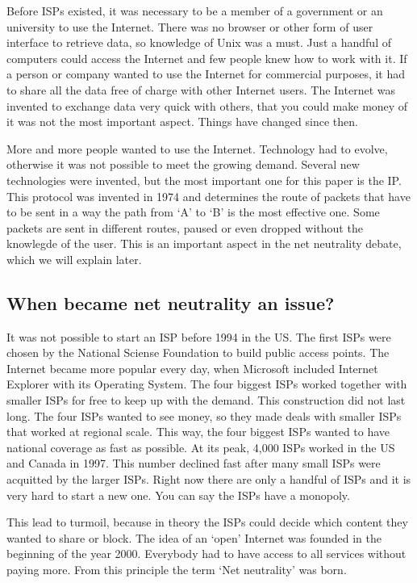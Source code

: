 Before \acp{ISP} existed, it was necessary to be a member of a government or an university to use the Internet. There was no browser or other form of user interface to retrieve data, so knowledge of Unix was a must. Just a handful of computers could access the Internet and few people knew how to work with it. If a person or company wanted to use the Internet for commercial purposes, it had to share all the data free of charge with other Internet users. The Internet was invented to exchange data very quick with others, that you could make money of it was not the most important aspect. Things have changed since then.

More and more people wanted to use the Internet. Technology had to evolve, otherwise it was not possible to meet the growing demand. Several new technologies were invented, but the most important one for this paper is the \acf{IP}. This protocol was invented in 1974 and determines the route of packets that have to be sent in a way the path from `A' to `B' is the most effective one. Some packets are sent in different routes, paused or even dropped without the knowlegde of the user. This is an important aspect in the net neutrality debate, which we will explain later.

\subsection{When became net neutrality an issue?}
It was not possible to start an \ac{ISP} before 1994 in the US. The first \acp{ISP} were chosen by the National Sciense Foundation to build public access points. The Internet became more popular every day,  when Microsoft included Internet Explorer with its Operating System. The four biggest \acp{ISP} worked together with smaller \acp{ISP} for free to keep up with the demand. This construction did not last long. The four \acp{ISP} wanted to see money, so they made deals with smaller \acp{ISP} that worked at regional scale. This way, the four biggest \acp{ISP} wanted to have national coverage as fast as possible. At its peak, 4,000 \acp{ISP} worked in the US and Canada in 1997. This number declined fast after many small \acp{ISP} were acquitted by the larger \acp{ISP}. Right now there are only a handful of \acp{ISP} and it is very hard to start a new one. You can say the \acp{ISP} have a monopoly.

This lead to turmoil, because in theory the \acp{ISP} could decide which content they wanted to share or block. The idea of an `open' Internet was founded in the beginning of the year 2000. Everybody had to have access to all services without paying more. From this principle the term `Net neutrality' was born.